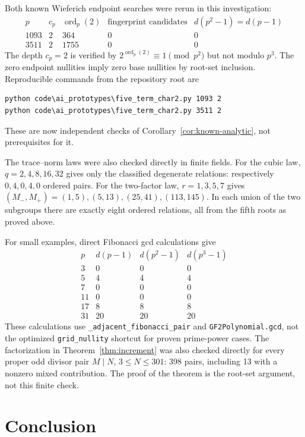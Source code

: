 \documentclass[a4paper]{article}
\newcommand{\ord}{\operatorname{ord}}
\begin{document}
Both known Wieferich endpoint searches were rerun in this investigation:
\[
\begin{array}{c|rrrr}
 p&c_p&\ord_p(2)&\text{fingerprint candidates}&
       d(p^2-1)=d(p-1)\\ \hline
 1093&2&364&0&0\\
 3511&2&1755&0&0
\end{array}
\]
The depth $c_p=2$ is verified by
$2^{\ord_p(2)}\equiv1\pmod{p^2}$ but not modulo $p^3$.
The zero endpoint nullities imply zero base nullities by root-set
inclusion.  Reproducible commands from the repository root are
\begin{verbatim}
python code\ai_prototypes\five_term_char2.py 1093 2
python code\ai_prototypes\five_term_char2.py 3511 2
\end{verbatim}
These are now independent checks of Corollary~\ref{cor:known-analytic},
not prerequisites for it.

The trace--norm laws were also checked directly in finite fields.
For the cubic law, $q=2,4,8,16,32$ gives only the classified degenerate
relations: respectively $0,4,0,4,0$ ordered pairs.
For the two-factor law, $r=1,3,5,7$ gives
$(M_-,M_+)=(1,5),(5,13),(25,41),(113,145)$.
In each union of the two subgroups there are exactly eight ordered
relations, all from the fifth roots as proved above.

For small examples, direct Fibonacci gcd calculations give
\[
\begin{array}{c|rrr}
 p&d(p-1)&d(p^2-1)&d(p^3-1)\\ \hline
 3&0&0&0\\
 5&4&4&4\\
 7&0&0&0\\
 11&0&0&0\\
 17&8&8&8\\
 31&20&20&20
\end{array}
\]
These calculations use \texttt{\_adjacent\_fibonacci\_pair} and
\texttt{GF2Polynomial.gcd}, not the optimized
\texttt{grid\_nullity} shortcut for proven prime-power cases.
The factorization in Theorem~\ref{thm:increment} was also checked
directly for every proper odd divisor pair $M\mid N$, $3\leq N\leq301$:
398 pairs, including 13 with a nonzero mixed contribution.
The proof of the theorem is the root-set argument, not this finite
check.

\section{Conclusion}\label{sec:conclusion}
\end{document}
